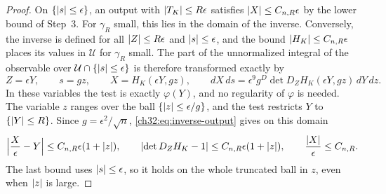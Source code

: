 \begin{proof}
On $\{\lvert s\rvert\le\epsilon\}$, an output with $\lvert T_K\rvert\le R\epsilon$ satisfies $\lvert X\rvert\le C_{n,R}\epsilon$ by the lower bound of Step~3. For $\gamma_R$ small, this lies in the domain of the inverse. Conversely, the inverse is defined for all $\lvert Z\rvert\le R\epsilon$ and $\lvert s\rvert\le\epsilon$, and the bound $\lvert H_K\rvert\le C_{n,R}\epsilon$ places its values in $\mathcal U$ for $\gamma_R$ small. The part of the unnormalized integral of the observable over $\mathcal U\cap\{\lvert s\rvert\le\epsilon\}$ is therefore transformed exactly by
\begin{equation}\label{ch32:eq:core-change}
 Z=\epsilon Y,\qquad s=gz,\qquad X=H_K(\epsilon Y,gz),\qquad dX\,ds=\epsilon^9g^D\det D_ZH_K(\epsilon Y,gz)\,dY\,dz.
\end{equation}
In these variables the test is exactly $\varphi(Y)$, and no regularity of $\varphi$ is needed. The variable $z$ ranges over the ball $\{\lvert z\rvert\le\epsilon/g\}$, and the test restricts $Y$ to $\{\lvert Y\rvert\le R\}$. Since $g=\epsilon^2/\sqrt n$, \eqref{ch32:eq:inverse-output} gives on this domain
\begin{equation}\label{ch32:eq:scaled-inverse}
 \Bigl\lvert\frac X\epsilon-Y\Bigr\rvert\le C_{n,R}\epsilon(1+\lvert z\rvert),\qquad\lvert \det D_ZH_K-1\rvert\le C_{n,R}\epsilon(1+\lvert z\rvert),\qquad\frac{\lvert X\rvert}\epsilon\le C_{n,R}.
\end{equation}
The last bound uses $\lvert s\rvert\le\epsilon$, so it holds on the whole truncated ball in $z$, even when $\lvert z\rvert$ is large.


\end{proof}
